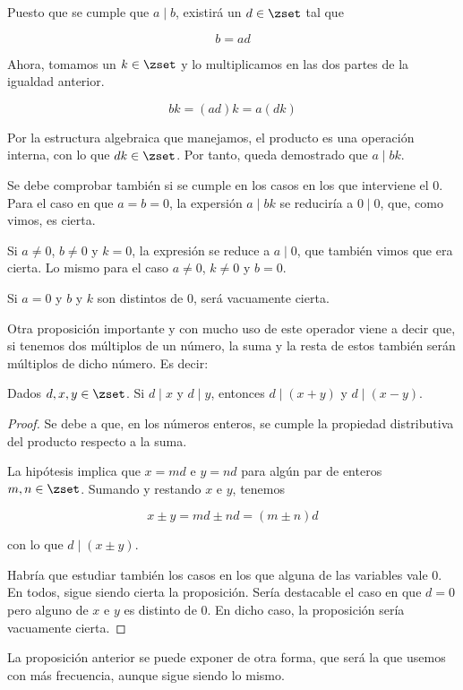   Puesto que se cumple que $a \mid b$, existirá un $d \in \zset$ tal que

  $$ b = ad $$

  Ahora, tomamos un $k \in \zset$ y lo multiplicamos en las dos partes de la
  igualdad anterior.

  $$ bk = (ad)k = a(dk) $$

  Por la estructura algebraica que manejamos, el producto es una operación
  interna, con lo que $dk \in \zset$. Por tanto, queda demostrado que $a
  \mid bk$.

  Se debe comprobar también si se cumple en los casos en los que interviene
  el 0. Para el caso en que $a = b = 0$, la expersión $a \mid bk$ se
  reduciría a $0 \mid 0$, que, como vimos, es cierta.

  Si $a \neq 0$, $b \neq 0$ y $k = 0$, la expresión se reduce a $a \mid 0$,
  que también vimos que era cierta. Lo mismo para el caso $a \neq 0$, $k
  \neq 0$ y $b = 0$.

  Si $a = 0$ y $b$ y $k$ son distintos de 0, será vacuamente cierta.
  \fi

Otra proposición importante y con mucho uso de este operador viene a decir
que, si tenemos dos múltiplos de un número, la suma y la resta de estos
también serán múltiplos de dicho número. Es decir:

\begin{proposition}
  Dados $d, x, y \in \zset$. Si $d \mid x$ y $d \mid y$, entonces $d \mid (x
  + y)$ y $d \mid (x - y)$.
\end{proposition}

\begin{proof}
  Se debe a que, en los números enteros, se cumple la propiedad distributiva
  del producto respecto a la suma.

  La hipótesis implica que $x = md$ e $y = nd$ para algún par de enteros $m,
  n \in \zset$. Sumando y restando $x$ e $y$, tenemos

  $$ x \pm y = md \pm nd = (m \pm n)d $$

  \noindent con lo que $d \mid (x \pm y)$.

  Habría que estudiar también los casos en los que alguna de las variables
  vale 0. En todos, sigue siendo cierta la proposición. Sería destacable el
  caso en que $d = 0$ pero alguno de $x$ e $y$ es distinto de 0. En dicho
  caso, la proposición sería vacuamente cierta.
\end{proof}

La proposición anterior se puede exponer de otra forma, que será la que
usemos con más frecuencia, aunque sigue siendo lo mismo.

